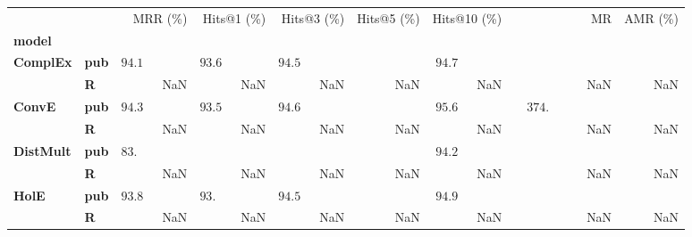 \begin{tabular}{llrrrrrrr}
\toprule
       &   &                    MRR (\%) &                 Hits@1 (\%) &                 Hits@3 (\%) & Hits@5 (\%) &                Hits@10 (\%) &                                         MR & AMR (\%) \\
\textbf{model} & {} &                             &                             &                             &             &                             &                                            &          \\
\midrule
\textbf{ComplEx} & \textbf{pub} &  $94.1\phantom{0 \pm 0.00}$ &  $93.6\phantom{0 \pm 0.00}$ &  $94.5\phantom{0 \pm 0.00}$ &             &  $94.7\phantom{0 \pm 0.00}$ &                                            &          \\
       & \textbf{R} &                         NaN &                         NaN &                         NaN &         NaN &                         NaN &                                        NaN &      NaN \\\midrule
\textbf{ConvE} & \textbf{pub} &  $94.3\phantom{0 \pm 0.00}$ &  $93.5\phantom{0 \pm 0.00}$ &  $94.6\phantom{0 \pm 0.00}$ &             &  $95.6\phantom{0 \pm 0.00}$ &  $\phantom{00}374.\phantom{00 \pm 000.00}$ &          \\
       & \textbf{R} &                         NaN &                         NaN &                         NaN &         NaN &                         NaN &                                        NaN &      NaN \\\midrule
\textbf{DistMult} & \textbf{pub} &  $83.\phantom{00 \pm 0.00}$ &                             &                             &             &  $94.2\phantom{0 \pm 0.00}$ &                                            &          \\
       & \textbf{R} &                         NaN &                         NaN &                         NaN &         NaN &                         NaN &                                        NaN &      NaN \\\midrule
\textbf{HolE} & \textbf{pub} &  $93.8\phantom{0 \pm 0.00}$ &  $93.\phantom{00 \pm 0.00}$ &  $94.5\phantom{0 \pm 0.00}$ &             &  $94.9\phantom{0 \pm 0.00}$ &                                            &          \\
       & \textbf{R} &                         NaN &                         NaN &                         NaN &         NaN &                         NaN &                                        NaN &      NaN \\

\end{tabular}
